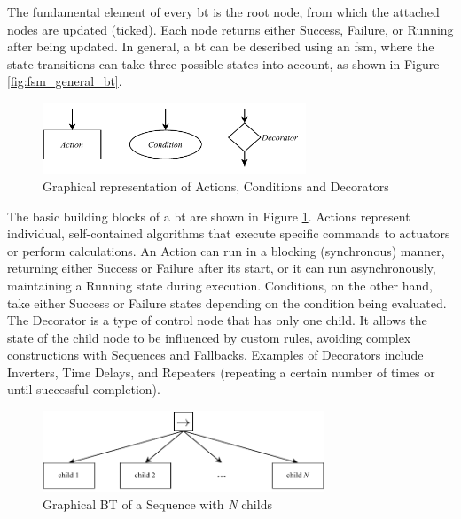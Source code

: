 The fundamental element of every \gls{bt} is the root node, from which the attached nodes are updated (ticked). Each node returns either Success, Failure, or Running after being updated. In general, a \gls{bt} can be described using an \gls{fsm}, where the state transitions can take three possible states into account, as shown in Figure \ref{fig:fsm_general_bt}.

\begin{figure}[h]
    \centering \captionsetup{justification=centering}
    \includegraphics[width=0.7\textwidth]{figures/20_state_of_the_art/bt_types.pdf}
    \caption{Graphical representation of Actions, Conditions and Decorators}
    \label{fig:bt_types}
\end{figure}

The basic building blocks of a \gls{bt} are shown in Figure \ref{fig:bt_types}. Actions represent individual, self-contained algorithms that execute specific commands to actuators or perform calculations. An Action can run in a blocking (synchronous) manner, returning either Success or Failure after its start, or it can run asynchronously, maintaining a Running state during execution. Conditions, on the other hand, take either Success or Failure states depending on the condition being evaluated. The Decorator is a type of control node that has only one child. It allows the state of the child node to be influenced by custom rules, avoiding complex constructions with Sequences and Fallbacks. Examples of Decorators include Inverters, Time Delays, and Repeaters (repeating a certain number of times or until successful completion).

\begin{figure}[h]
    \centering \captionsetup{justification=centering}
    \includegraphics[width=0.75\textwidth]{figures/20_state_of_the_art/sequence.pdf}
    \caption{Graphical BT of a Sequence with \textit{N} childs}
    \label{fig:sequence}
\end{figure}

